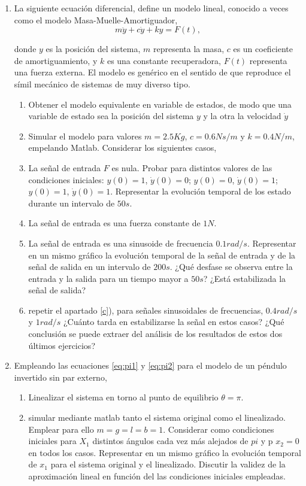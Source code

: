 \begin{enumerate}
\item La siguiente ecuación diferencial, define un modelo lineal, conocido a veces como el modelo Masa-Muelle-Amortiguador,
\begin{equation*}
m\ddot y + c \dot y + k y = F(t),
\end{equation*}

donde $y$ es la posición del sistema, $m$ representa la masa, $c$ es un coeficiente de amortiguamiento, y $k$ es una constante recuperadora, $F(t)$ representa una fuerza externa. El modelo es genérico en el sentido de que reproduce el símil mecánico de sistemas de muy diverso tipo.
\begin{enumerate}
\item Obtener el modelo equivalente en variable de estados, de modo que una variable de estado sea la posición del sistema $y$ y la otra la velocidad $\dot y$
\item Simular el modelo para valores $m=2.5Kg$, $c=0.6Ns/m$ y $k=0.4N/m$, empelando Matlab. Considerar los siguientes casos,
\item La señal de entrada $F$ es nula. Probar para distintos valores de las condiciones iniciales: $y(0) = 1$, $ \dot y(0) =0$; $y(0) = 0$, $\dot y(0) = 1$; $y(0) = 1$, $ \dot y(0) = 1$. Representar la evolución temporal de los estado durante un intervalo de $50s$.
\item La señal de entrada es una fuerza constante de $1N$.
\item \label{c} La señal de entrada  es una sinusoide de frecuencia $0.1 rad/s$. Representar en un mismo gráfico la evolución temporal de la señal de entrada y de la señal de salida en un intervalo de $200s$. ¿Qué desfase se observa entre la entrada y la salida para un tiempo mayor a $50s$? ¿Está estabilizada la señal de salida?
\item \label{d} repetir el apartado \ref{c}), para señales sinusoidales de frecuencias, $0.4 rad/s$ y $1 rad/s$ ¿Cuánto tarda en estabilizarse la señal en estos casos? ¿Qué conclusión se puede extraer del análisis de los resultados de estos dos últimos ejercicios?
\end{enumerate}

\item Empleando las ecuaciones \ref{eq:pi1} y \ref{eq:pi2} para el modelo de un péndulo invertido sin par externo,
\begin{enumerate}
\item Linealizar el sistema en torno al punto de equilibrio $\theta = \pi$.
\item simular mediante matlab tanto el sistema original como el linealizado. Emplear para ello $m = g = l = b = 1$. Considerar como condiciones iniciales para $X_1$ distintos ángulos cada vez más alejados de $pi$ y p $x_2 = 0$ en todos los casos. Representar en un mismo gráfico la evolución temporal de $x_1$ para el sistema original y el linealizado. Discutir la validez de la aproximación lineal  en función del las condiciones iniciales empleadas.
\end{enumerate}


\end{enumerate}
